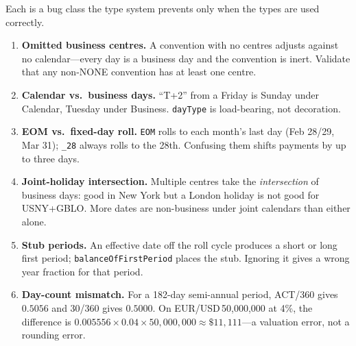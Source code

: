 Each is a bug class the type system prevents only when the types are used correctly.
\begin{enumerate}[nosep]
\item \textbf{Omitted business centres.} A convention with no centres adjusts against no calendar---every day is a business day and the convention is inert. Validate that any non-NONE convention has at least one centre.
\item \textbf{Calendar vs.\ business days.} ``T+2'' from a Friday is Sunday under Calendar, Tuesday under Business. \texttt{dayType} is load-bearing, not decoration.
\item \textbf{EOM vs.\ fixed-day roll.} \texttt{EOM} rolls to each month's last day (Feb 28/29, Mar 31); \texttt{\_28} always rolls to the 28th. Confusing them shifts payments by up to three days.
\item \textbf{Joint-holiday intersection.} Multiple centres take the \emph{intersection} of business days: good in New York but a London holiday is not good for USNY+GBLO. More dates are non-business under joint calendars than either alone.
\item \textbf{Stub periods.} An effective date off the roll cycle produces a short or long first period; \texttt{balanceOfFirstPeriod} places the stub. Ignoring it gives a wrong year fraction for that period.
\item \textbf{Day-count mismatch.} For a 182-day semi-annual period, ACT/360 gives $0.5056$ and 30/360 gives $0.5000$. On EUR/USD\,50{,}000{,}000 at 4\%, the difference is $0.005556\times0.04\times50{,}000{,}000\approx\$11{,}111$---a valuation error, not a rounding error.
\end{enumerate}
